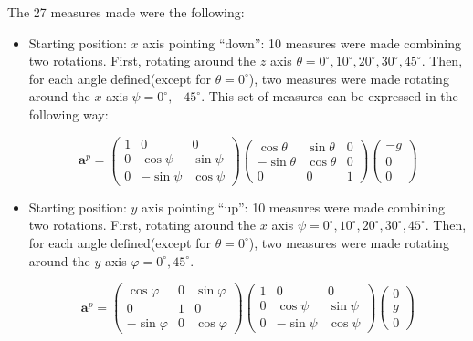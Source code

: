 \documentclass[conference]{IEEEtran}
\begin{document}
The 27 measures made were the following:
\begin{itemize}
\item Starting position: $x$ axis pointing ``down'': 10 measures were made combining two rotations. First, rotating around the $z$ axis $\theta =0^\circ, 10^\circ, 20^\circ, 30^\circ, 45^\circ$. Then, for each angle defined(except for $\theta = 0^\circ$), two measures were made rotating around the $x$ axis $\psi = 0^\circ, -45^\circ$. This set of measures can be expressed in the following way:
\begin{scriptsize}
\begin{equation}
\mathbf{a}^p = \left(\begin{array}{ccc}
1 & 0 & 0\\
0 & \cos \psi & \sin \psi \\
0 & -\sin \psi & \cos \psi
\end{array}\right)\left(\begin{array}{ccc}
\cos \theta & \sin \theta & 0\\
-\sin \theta & \cos \theta & 0\\
0 & 0 & 1
\end{array}\right)\left(\begin{array}{c}
-g\\
0\\
0
\end{array}\right)
\label{eq:acc_x}
\end{equation}
\end{scriptsize}
 

\item Starting position: $y$ axis pointing ``up'': 10 measures were made combining two rotations. First, rotating around the $x$ axis $\psi =0^\circ, 10^\circ, 20^\circ, 30^\circ, 45^\circ$. Then, for each angle defined(except for $\theta = 0^\circ$), two measures were made rotating around the $y$ axis $\varphi = 0^\circ, 45^\circ$.   

\begin{scriptsize}
\begin{equation}
\mathbf{a}^p = \left(\begin{array}{ccc}
\cos \varphi & 0 &\sin \varphi\\
0 & 1 & 0\\
-\sin \varphi & 0 & \cos \varphi
\end{array}\right)\left(\begin{array}{ccc}
1 & 0 & 0\\
0 & \cos \psi & \sin \psi \\
0 & -\sin \psi & \cos \psi
\end{array}\right)\left(\begin{array}{c}
0\\
g\\
0
\end{array}\right)
\label{eq:acc_y}
\end{equation}
\end{scriptsize}


\end{itemize}
\end{document}

